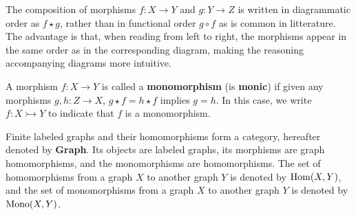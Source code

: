 \begin{notation}
    The composition of morphisms \( f : X \to Y \) and \( g : Y \to Z \) is written in diagrammatic order as \( f \star g \), rather than in functional order \( g \circ f \) as is common in litterature. The advantage is that, when reading from left to right, the morphisms appear in the same order as in the corresponding diagram, making the reasoning accompanying diagrams more intuitive. 
\end{notation}  

\begin{definition}[Monomorphism]
    \label{def:cat:homo}
    A morphism \( f : X \to Y \) is called a \textbf{monomorphism} (is \textbf{monic}) if given any morphisms \( g,h: Z \to X  \), \( g \star f = h \star f \) implies \( g = h \). 
    In this case, we write $f : X \rightarrowtail Y$ to indicate that $f$ is a monomorphism.
\end{definition} 

\begin{example} 
    Finite labeled graphs and their homomorphisms form a category, hereafter denoted by \textbf{Graph}. Its objects are labeled graphs, its morphisms are graph homomorphisms, and the monomorphisms are homomorphisms. 
    The set of homomorphisms from a graph $X$ to another graph $Y$ is denoted by $\operatorname{Hom}(X,Y)$, and the set of monomorphisms from a graph $X$ to another graph $Y$ is denoted by $\operatorname{Mono}(X,Y)$.
\end{example}

 

